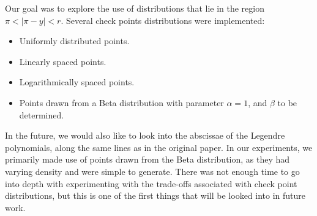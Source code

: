 Our goal was to explore the use of distributions that lie in the
region $\pi < |\pi - y| < r$. Several check points distributions were
implemented:
\begin{itemize}
\item Uniformly distributed points.
\item Linearly spaced points.
\item Logarithmically spaced points.
\item Points drawn from a Beta distribution with parameter
  $\alpha = 1$, and $\beta$ to be determined.
\end{itemize}
In the future, we would also like to look into the abscissae of the
Legendre polynomials, along the same lines as in the original
paper. In our experiments, we primarily made use of points drawn from
the Beta distribution, as they had varying density and were simple to
generate. There was not enough time to go into depth with
experimenting with the trade-offs associated with check point
distributions, but this is one of the first things that will be looked
into in future work.
